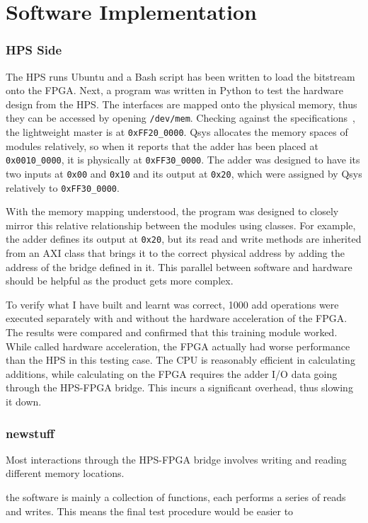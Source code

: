 \chapter{Software Implementation}

\subsection{HPS Side}
The HPS runs Ubuntu and a Bash script has been written to load the bitstream onto the FPGA.
Next, a program was written in Python to test the hardware design from the HPS.
The interfaces are mapped onto the physical memory, thus they can be accessed by opening \texttt{/dev/mem}.
Checking against the specifications~\cite{Altera6}, the lightweight master is at \texttt{0xFF20\_0000}.
Qsys allocates the memory spaces of modules relatively, so when it reports that the adder has been placed at \texttt{0x0010\_0000}, it is physically at \texttt{0xFF30\_0000}.
The adder was designed to have its two inputs at \texttt{0x00} and \texttt{0x10} and its output at \texttt{0x20}, which were assigned by Qsys relatively to \texttt{0xFF30\_0000}.

With the memory mapping understood, the program was designed to closely mirror this relative relationship between the modules using classes.
For example, the adder defines its output at \texttt{0x20}, but its read and write methods are inherited from an AXI class that brings it to the correct physical address by adding the address of the bridge defined in it.
This parallel between software and hardware should be helpful as the product gets more complex.

To verify what I have built and learnt was correct, 1000 add operations were executed separately with and without the hardware acceleration of the FPGA.
The results were compared and confirmed that this training module worked.
While called hardware acceleration, the FPGA actually had worse performance than the HPS in this testing case.
The CPU is reasonably efficient in calculating additions, while calculating on the FPGA requires the adder I/O data going through the HPS-FPGA bridge.
This incurs a significant overhead, thus slowing it down.

\subsection{newstuff}
Most interactions through the HPS-FPGA bridge involves writing and reading different memory locations.

the software is mainly a collection of functions, each performs a series of reads and writes.
This means the final test procedure would be easier to 